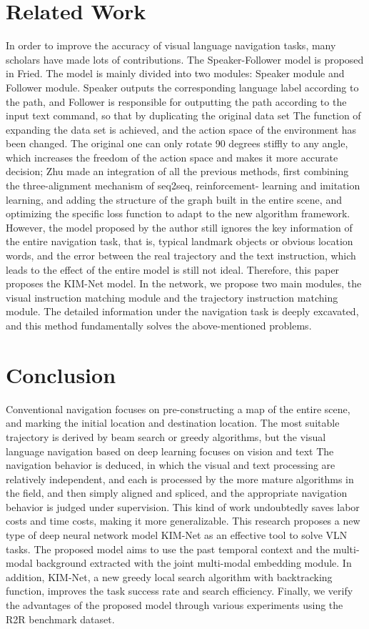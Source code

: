 \section{Related Work}
In order to improve the accuracy of visual language navigation tasks, many scholars \cite{fried2018speaker,hwang2021joint,majumdar2020improving,ma2019regretful,wang2019reinforced,zhu2020vision} have made lots of contributions. The Speaker-Follower model is proposed in Fried. The model is mainly divided into two modules: Speaker module and Follower module. Speaker outputs the corresponding language label according to the path, and Follower is responsible for outputting the path according to the input text command, so that by duplicating the original data set The function of expanding the data set is achieved, and the action space of the environment has been changed. The original one can only rotate 90 degrees stiffly to any angle, which increases the freedom of the action space and makes it more accurate decision; Zhu made an integration of all the previous methods, first combining the three-alignment mechanism of seq2seq, reinforcement- learning and imitation learning, and adding the structure of the graph built in the entire scene, and optimizing the specific loss function to adapt to the new algorithm framework. However, the model proposed by the author still ignores the key information of the entire navigation task, that is, typical landmark objects or obvious location words, and the error between the real trajectory and the text instruction, which leads to the effect of the entire model is still not ideal. Therefore, this paper proposes the KIM-Net model. In the network, we propose two main modules, the visual instruction matching module and the trajectory instruction matching module. The detailed information under the navigation task is deeply excavated, and this method fundamentally solves the above-mentioned problems.

\section{Conclusion}
Conventional navigation focuses on pre-constructing a map of the entire scene, and marking the initial location and destination location. The most suitable trajectory is derived by beam search or greedy algorithms, but the visual language navigation based on deep learning focuses on vision and text The navigation behavior is deduced, in which the visual and text processing are relatively independent, and each is processed by the more mature algorithms in the field, and then simply aligned and spliced, and the appropriate navigation behavior is judged under supervision. This kind of work undoubtedly saves labor costs and time costs, making it more generalizable. This research proposes a new type of deep neural network model KIM-Net as an effective tool to solve VLN tasks. The proposed model aims to use the past temporal context and the multi-modal background extracted with the joint multi-modal embedding module. In addition, KIM-Net, a new greedy local search algorithm with backtracking function, improves the task success rate and search efficiency. Finally, we verify the advantages of the proposed model through various experiments using the R2R benchmark dataset.
	
